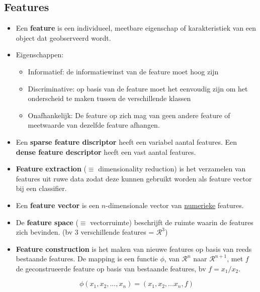 \subsection{Features}
\begin{itemize}
	\item Een \textbf{feature} is een individueel, meetbare eigenschap of karakteristiek van een object dat geobserveerd wordt.
	\item Eigenschappen:
	\begin{itemize}
		\item Informatief: de informatiewinst van de feature moet hoog zijn
		\item Discriminative: op basis van de feature moet het eenvoudig zijn om het onderscheid te maken tussen de verschillende klassen
		\item Onafhankelijk: De feature op zich mag van geen andere feature of meetwaarde van dezelfde feature afhangen.


	\end{itemize}
	\item Een \textbf{sparse feature discriptor} heeft een variabel aantal features. Een \textbf{dense feature descriptor} heeft een vast aantal features.
	\item \textbf{Feature extraction} ($\equiv$ dimensionality reduction) is het verzamelen van features uit ruwe data zodat deze kunnen gebruikt worden als feature vector bij een classifier. 
	\item Een \textbf{feature vector} is een $n$-dimensionale vector van \underline{numerieke} features.
	\item De \textbf{feature space} ($\equiv$ vectorruimte) beschrijft de ruimte waarin de features zich bevinden. (bv 3 verschillende features = $\mathcal{R}^3$)
	\item \textbf{Feature construction} is het maken van nieuwe features op basis van reeds bestaande features. De mapping is een functie $\phi$, van $\mathcal{R}^n$ naar $\mathcal{R}^{n + 1}$, met $f$ de geconstrueerde feature op basis van bestaande features, bv $f = x_1/x_2$.
	
	$$\phi(x_1, x_2, ..., x_n) = (x_1, x_2, ... x_n, f)$$

\end{itemize}
